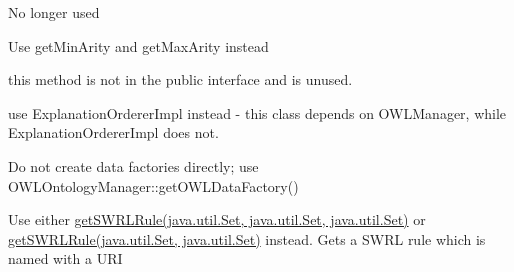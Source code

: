 \begin{DoxyRefList}
\item[\label{deprecated__deprecated000033}%
\hypertarget{deprecated__deprecated000033}{}%
Member \hyperlink{enumorg_1_1semanticweb_1_1owlapi_1_1vocab_1_1_s_k_o_s_vocabulary_afe205f3baeafbee4f3a9951d31543b56}{org.semanticweb.owlapi.vocab.S\-K\-O\-S\-Vocabulary.R\-E\-S\-O\-U\-R\-C\-E} ]No longer used  
\item[\label{deprecated__deprecated000035}%
\hypertarget{deprecated__deprecated000035}{}%
Member \hyperlink{enumorg_1_1semanticweb_1_1owlapi_1_1vocab_1_1_s_w_r_l_built_ins_vocabulary_a76018203019bac62825220d2effe1bb7}{org.semanticweb.owlapi.vocab.S\-W\-R\-L\-Built\-Ins\-Vocabulary.get\-Arity} ()]Use get\-Min\-Arity and get\-Max\-Arity instead  
\item[\label{deprecated__deprecated000047}%
\hypertarget{deprecated__deprecated000047}{}%
Member \hyperlink{classuk_1_1ac_1_1manchester_1_1cs_1_1bhig_1_1util_1_1_mutable_tree_3_01_n_01_4_a1172b85206dbd421fa2f1819a9ad8364}{uk.ac.manchester.cs.bhig.util.Mutable\-Tree$<$ N $>$.replace} (Mutable\-Tree$<$ N $>$ tree)]this method is not in the public interface and is unused.  
\item[\label{deprecated__deprecated000036}%
\hypertarget{deprecated__deprecated000036}{}%
Class \hyperlink{classuk_1_1ac_1_1manchester_1_1cs_1_1owl_1_1explanation_1_1ordering_1_1_default_explanation_orderer}{uk.ac.manchester.cs.owl.explanation.ordering.Default\-Explanation\-Orderer} ]use Explanation\-Orderer\-Impl instead -\/ this class depends on O\-W\-L\-Manager, while Explanation\-Orderer\-Impl does not.  
\item[\label{deprecated__deprecated000037}%
\hypertarget{deprecated__deprecated000037}{}%
Member \hyperlink{classuk_1_1ac_1_1manchester_1_1cs_1_1owl_1_1owlapi_1_1_o_w_l_data_factory_impl_a7aa2da611ebafe184c2a9b52b82e986a}{uk.ac.manchester.cs.owl.owlapi.O\-W\-L\-Data\-Factory\-Impl.get\-Instance} ()]Do not create data factories directly; use O\-W\-L\-Ontology\-Manager\-::get\-O\-W\-L\-Data\-Factory()  
\item[\label{deprecated__deprecated000038}%
\hypertarget{deprecated__deprecated000038}{}%
Member \hyperlink{classuk_1_1ac_1_1manchester_1_1cs_1_1owl_1_1owlapi_1_1_o_w_l_data_factory_impl_aabd296864fd7ff30d4425c1039f25e6c}{uk.ac.manchester.cs.owl.owlapi.O\-W\-L\-Data\-Factory\-Impl.get\-S\-W\-R\-L\-Rule} (I\-R\-I iri, Set$<$?extends S\-W\-R\-L\-Atom $>$ body, Set$<$?extends S\-W\-R\-L\-Atom $>$ head)]Use either \hyperlink{}{get\-S\-W\-R\-L\-Rule(java.\-util.\-Set, java.\-util.\-Set, java.\-util.\-Set)} or \hyperlink{}{get\-S\-W\-R\-L\-Rule(java.\-util.\-Set, java.\-util.\-Set)} instead. Gets a S\-W\-R\-L rule which is named with a U\-R\-I  

\end{DoxyRefList}
